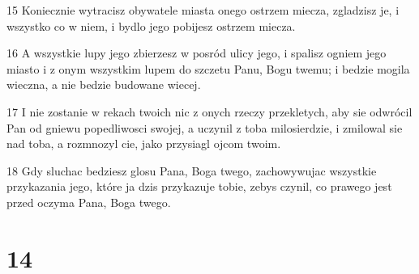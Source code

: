 \par 15 Koniecznie wytracisz obywatele miasta onego ostrzem miecza, zgladzisz je, i wszystko co w niem, i bydlo jego pobijesz ostrzem miecza.
\par 16 A wszystkie lupy jego zbierzesz w posród ulicy jego, i spalisz ogniem jego miasto i z onym wszystkim lupem do szczetu Panu, Bogu twemu; i bedzie mogila wieczna, a nie bedzie budowane wiecej.
\par 17 I nie zostanie w rekach twoich nic z onych rzeczy przekletych, aby sie odwrócil Pan od gniewu popedliwosci swojej, a uczynil z toba milosierdzie, i zmilowal sie nad toba, a rozmnozyl cie, jako przysiagl ojcom twoim.
\par 18 Gdy sluchac bedziesz glosu Pana, Boga twego, zachowywujac wszystkie przykazania jego, które ja dzis przykazuje tobie, zebys czynil, co prawego jest przed oczyma Pana, Boga twego.

\chapter{14}

